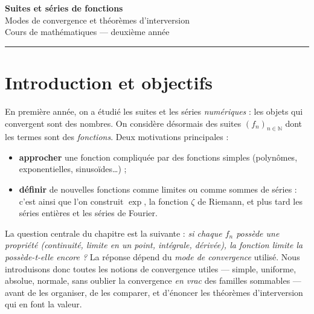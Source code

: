 \documentclass[11pt,a4paper]{article}
\theoremstyle{plain}
\theoremstyle{definition}
\theoremstyle{remark}
\newcommand{\N}{\mathbb{N}}
\numberwithin{equation}{section}
\begin{document}
\begin{center}
    {\LARGE\bfseries Suites et séries de fonctions}\\[2.5mm]
    {\large Modes de convergence et théorèmes d'interversion}\\[1.5mm]
    {\normalsize Cours de mathématiques --- deuxième année}
\end{center}
\vspace{2mm}
\hrule
\vspace{5mm}

\tableofcontents
\vspace{5mm}

\section*{Introduction et objectifs}

En première année, on a étudié les suites et les séries \emph{numériques} :
les objets qui convergent sont des nombres. On considère désormais des suites
$(f_n)_{n\in\N}$ dont les termes sont des \emph{fonctions}. Deux motivations
principales :
\begin{itemize}
    \item \textbf{approcher} une fonction compliquée par des fonctions simples
    (polynômes, exponentielles, sinusoïdes\ldots) ;
    \item \textbf{définir} de nouvelles fonctions comme limites ou comme sommes
    de séries : c'est ainsi que l'on construit $\exp$, la fonction $\zeta$ de
    Riemann, et plus tard les séries entières et les séries de Fourier.
\end{itemize}

La question centrale du chapitre est la suivante : \emph{si chaque $f_n$
possède une propriété (continuité, limite en un point, intégrale, dérivée),
la fonction limite la possède-t-elle encore ?} La réponse dépend du
\emph{mode de convergence} utilisé. Nous introduisons donc
toutes les notions de convergence utiles --- simple, uniforme, absolue,
normale, sans oublier la convergence \emph{en vrac} des familles
sommables --- avant de les organiser, de les comparer, et d'énoncer les
théorèmes d'interversion qui en font la valeur.
\end{document}

